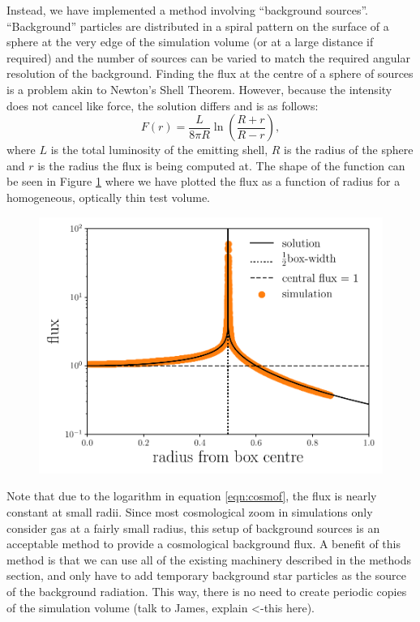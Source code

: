 \documentclass[fleq,usenatbib]{mnras}
\begin{document}
Instead, we have implemented a method involving ``background sources''. 
``Background'' particles are distributed in a spiral pattern on the surface of 
a sphere at the very edge of the simulation volume (or at a large distance if 
required) and the number of sources can be varied to match the required 
angular resolution  of the background. Finding the flux at the centre of a 
sphere of sources is a problem akin to Newton's Shell Theorem. However, 
because the intensity does not cancel like force, the solution differs and is 
as follows:
\begin{equation}
\label{eqn:cosmof}
F(r) = \frac{L}{8\pi R} \ln \left(\frac{R+r}{R-r}\right),
\end{equation}
where $L$ is the total luminosity of the emitting shell, $R$ is the radius of 
the sphere and $r$ is the radius the flux is being computed at. The shape of 
the function can be seen in Figure \ref{fig:cosmof} where we have plotted the 
flux as a function of radius for a homogeneous, optically thin test volume.
\begin{figure}
\includegraphics[width=1\linewidth]{Figures/cosmofield.pdf}
\caption{}
\label{fig:cosmof}
\end{figure}

Note that due to the logarithm in equation \ref{eqn:cosmof}, the flux is nearly 
constant at small radii. Since most cosmological zoom in simulations only 
consider gas at a fairly small radius, this setup of background sources is an 
acceptable method to provide a cosmological background flux. A benefit of this 
method is that we can use all of the existing machinery described in the 
methods section, and only have to add temporary background star particles as 
the source of the background radiation. This way, there is no need to create 
periodic copies of the simulation volume (talk to James, explain <-this here).
\end{document}
